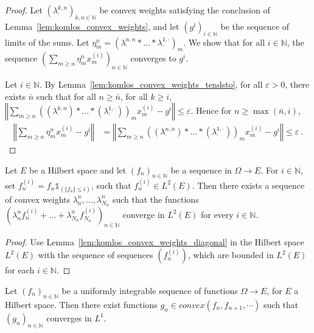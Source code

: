\begin{proof}
Let $(\lambda^{k,n}_\cdot)_{k, n \in \mathbb{N}}$ be convex weights satisfying the conclusion of Lemma~\ref{lem:komlos_convex_weights}, and let $(g^i)_{i\in \mathbb{N}}$ be the sequence of limits of the sums.
Let $\eta^n_m = (\lambda^{n,n}_\cdot * \ldots * \lambda^{1,\cdot}_\cdot)_m$.
We show that for all $i \in \mathbb{N}$, the sequence $\left(\sum_{m \ge n} \eta^n_m x_m^{(i)}\right)_{n \in \mathbb{N}}$ converges to $g^i$.

Let $i \in \mathbb{N}$.
By Lemma~\ref{lem:komlos_convex_weights_tendsto}, for all $\varepsilon > 0$, there exists $\bar{n}$ such that for all $n \ge \bar{n}$, for all $k \ge i$, $\left\Vert\sum_{m \ge n} \left((\lambda^{k,n}_\cdot) * \ldots * (\lambda^{1,\cdot}_\cdot)\right)_m x_m^{(i)} - g^i\right\Vert \le \varepsilon$.
Hence for $n \ge \max(\bar{n}, i)$,
\begin{align*}
  \left\Vert\sum_{m \ge n} \eta^n_m x_m^{(i)} - g^i\right\Vert
  &= \left\Vert\sum_{m \ge n} \left((\lambda^{n,n}_\cdot) * \ldots * (\lambda^{1,\cdot}_\cdot)\right)_m x_m^{(i)} - g^i\right\Vert
  \le \varepsilon
  \: .
\end{align*}
\end{proof}


\begin{lemma}\label{lem:komlos_convex_aux}
  \leanok
Let $E$ be a Hilbert space and let $(f_n)_{n \in \mathbb{N}}$ be a sequence in $\Omega \to E$.
For $i \in \mathbb{N}$, set $f_n^{(i)} = f_n \mathbb{1}_{(\Vert f_n \Vert \le i)}$, such that $f_n^{(i)} \in L^2(E)$.
Then there exists a sequence of convex weights $\lambda_n^{n}, \ldots, \lambda_{N_n}^{n}$ such that the functions
$\left(\lambda_n^{n} f_n^{(i)} + \ldots + \lambda_{N_n}^{n} f_{N_n}^{(i)} \right)_{n\in\mathbb{N}}$
converge in $L^2(E)$ for every $i \in \mathbb{N}$.
\end{lemma}

\begin{proof}
Use Lemma~\ref{lem:komlos_convex_weights_diagonal} in the Hilbert space $L^2(E)$ with the sequence of sequences $(f_n^{(i)})$, which are bounded in $L^2(E)$ for each $i \in \mathbb{N}$.
\end{proof}


\begin{lemma}\label{lem:komlos}
  \leanok
Let $(f_n)_{n\in\mathbb{N}}$ be a uniformly integrable sequence of functions $\Omega \to E$, for $E$ a Hilbert space.
Then there exist functions $g_n \in convex(f_n, f_{n+1}, \cdots)$ such that $(g_n)_{n\in\mathbb{N}}$ converges in $L^1$.
\end{lemma}

